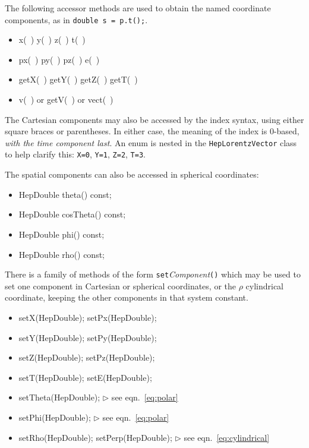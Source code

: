 \documentclass[twoside,12pt]{article}
\newcommand {\see}[1] {\hfill$\triangleright$ see eqn.~#1}
\newenvironment{shortlist}{%
\begin{itemize}
\setlength{\itemsep}{0pt}
\setlength{\parskip}{0pt}
}{%
\end{itemize}
}
\begin{document}
\noindent
The following accessor methods are used
to obtain the named coordinate components,
as in \verb|double s = p.t();|.
\begin{shortlist}
  \item x(~) \/\/\/ y(~) \/\/\/ z(~) \/\/\/ t(~)
  \item px(~) \/\/\/ py(~) \/\/\/ pz(~) \/\/\/ e(~)
  \item getX(~) \/\/\/ getY(~) \/\/\/ getZ(~) \/\/\/ getT(~)
  \item v(~) or getV(~) or vect(~)
\end{shortlist}


\noindent
The Cartesian components may also be accessed by the index syntax, 
using either square braces or parentheses.  
In either case, the meaning of the index is 0-based, {\em with the
time component last}.
An enum is nested in the {\tt HepLorentzVector} class to help clarify this: 
{\tt X=0}, {\tt Y=1}, {\tt Z=2}, {\tt T=3}.

The spatial components can also be accessed in spherical coordinates:
\begin{shortlist}
  \item HepDouble theta() const;
  \item HepDouble cosTheta() const;
  \item HepDouble phi() const;
  \item HepDouble rho() const;
\end{shortlist}

\noindent
There is a family of methods of the form
{\tt set}{\it Component}{\tt ()} which may be used to set 
one component in Cartesian or spherical coordinates, or the $\rho$
cylindrical coordinate,
keeping the other components in that system constant.  
\begin{shortlist}
  \item setX(HepDouble);  \/\/\/ setPx(HepDouble);  
  \item setY(HepDouble);  \/\/\/ setPy(HepDouble);  
  \item setZ(HepDouble);  \/\/\/ setPz(HepDouble);  
  \item setT(HepDouble);  \/\/\/ setE(HepDouble);  
  \item setTheta(HepDouble); \see{\ref{eq:polar}}
  \item setPhi(HepDouble);   \see{\ref{eq:polar}}
  \item setRho(HepDouble); \/\/\/  setPerp(HepDouble); 
						\see{\ref{eq:cylindrical}}
\end{shortlist}
\end{document}
